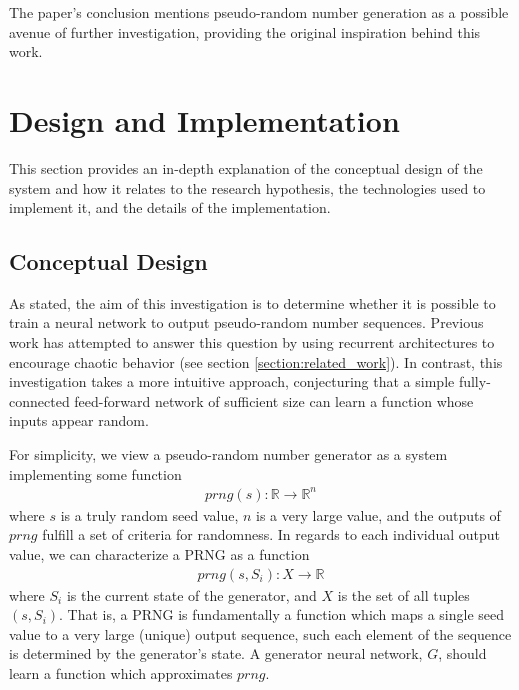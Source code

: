 \documentclass[12pt, titlepage]{report}
\theoremstyle{definition}
\begin{document}
The paper's conclusion mentions pseudo-random number generation as a possible avenue of further investigation, providing the original inspiration behind this work.





\chapter{Design and Implementation}\label{chapter:design}
This section provides an in-depth explanation of the conceptual design of the system and how it relates to the research hypothesis, the technologies used to implement it, and the details of the implementation.



\section{Conceptual Design}\label{section:conceptual_design}
As stated, the aim of this investigation is to determine whether it is possible to train a neural network to output pseudo-random number sequences. Previous work has attempted to answer this question by using recurrent architectures to encourage chaotic behavior (see section \ref{section:related_work}). In contrast, this investigation takes a more intuitive approach, conjecturing that a simple fully-connected feed-forward network of sufficient size can learn a function whose inputs appear random.

For simplicity, we view a pseudo-random number generator as a system implementing some function
\begin{gather}\label{eq:conceptual_prng}
prng(s) : \mathbb{R} \rightarrow \mathbb{R}^n
\end{gather}
where $s$ is a truly random seed value, $n$ is a very large value, and the outputs of $prng$ fulfill a set of criteria for randomness. In regards to each individual output value, we can characterize a PRNG as a function 
\begin{gather}
prng(s, S_i) : X \rightarrow \mathbb{R}
\end{gather}
where $S_i$ is the current state of the generator, and $X$ is the set of all tuples $(s, S_i)$. That is, a PRNG is fundamentally a function which maps a single seed value to a very large (unique) output sequence, such each element of the sequence is determined by the generator's state. A generator neural network, $G$, should learn a function which approximates $prng$.
\end{document}
